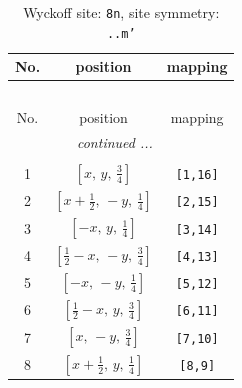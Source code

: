 \documentclass[fleqn,8pt]{jsarticle}
\begin{document}
\begin{longtable}{ccc}
\caption{Wyckoff site: {\tt 8n}, site symmetry: {\tt ..m'}}
 \\
 \hline \hline
No. & position & mapping \\ \hline \endfirsthead

\multicolumn{2}{l}{\tablename\ \thetable{}} \\
 \hline \hline
No. & position & mapping \\ \hline \endhead

 \hline \hline
\multicolumn{2}{r}{\footnotesize\it continued ...} \\ \endfoot

 \hline \hline
\multicolumn{2}{r}{} \\ \endlastfoot

1 & $\left[ x,\, y,\, \frac{3}{4} \right]$ & {\tt [1,16]} \\ \hline
2 & $\left[ x + \frac{1}{2},\, - y,\, \frac{1}{4} \right]$ & {\tt [2,15]} \\ \hline
3 & $\left[ - x,\, y,\, \frac{1}{4} \right]$ & {\tt [3,14]} \\ \hline
4 & $\left[ \frac{1}{2} - x,\, - y,\, \frac{3}{4} \right]$ & {\tt [4,13]} \\ \hline
5 & $\left[ - x,\, - y,\, \frac{1}{4} \right]$ & {\tt [5,12]} \\ \hline
6 & $\left[ \frac{1}{2} - x,\, y,\, \frac{3}{4} \right]$ & {\tt [6,11]} \\ \hline
7 & $\left[ x,\, - y,\, \frac{3}{4} \right]$ & {\tt [7,10]} \\ \hline
8 & $\left[ x + \frac{1}{2},\, y,\, \frac{1}{4} \right]$ & {\tt [8,9]} \\
\end{longtable}
\renewcommand{\arraystretch}{1.2}
\end{document}
